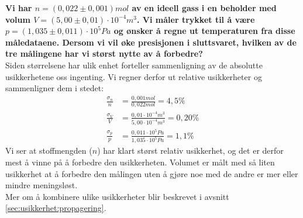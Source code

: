 \begin{texample}
{\bf
Vi har $n=(0,022\pm0,001)\unit{mol}$ av en ideell gass i en beholder med volum $V = (5,00\pm0,01)\cdot 10^{-4}\unit{m^3}$. Vi måler trykket til å være $p=(1,035\pm0,011)\cdot 10^5\unit{Pa}$ og ønsker å regne ut temperaturen fra disse måledataene. Dersom vi vil øke presisjonen i sluttsvaret, hvilken av de tre målingene har vi størst nytte av å forbedre?} \\

Siden størrelsene har ulik enhet forteller sammenligning av de absolutte usikkerhetene oss ingenting. Vi regner derfor ut relative usikkerheter og sammenligner dem i stedet:
\begin{align*}
	\frac{\sigma_n}{n} &= \frac{0,001\unit{mol}}{0,022\unit{mol}} = 4,5\% \\
	\frac{\sigma_V}{V} &= \frac{0,01\cdot10^{-4}\unit{m^3}}{5,00\cdot10^{-4}\unit{m^3}} = 0,20\% \\
	\frac{\sigma_p}{p} &= \frac{0,011\cdot10^5\unit{Pa}}{1,035\cdot10^5\unit{Pa}} = 1,1\%
\end{align*}
Vi ser at stoffmengden ($n$) har klart størst relativ usikkerhet, og det er derfor mest å vinne på å forbedre den usikkerheten. Volumet er målt med så liten usikkerhet at å forbedre den målingen uten å gjøre noe med de andre er mer eller mindre meningsløst. \\

Mer om å kombinere ulike usikkerheter blir beskrevet i avsnitt \ref{sec:usikkerhet:propagering}.
\end{texample}

